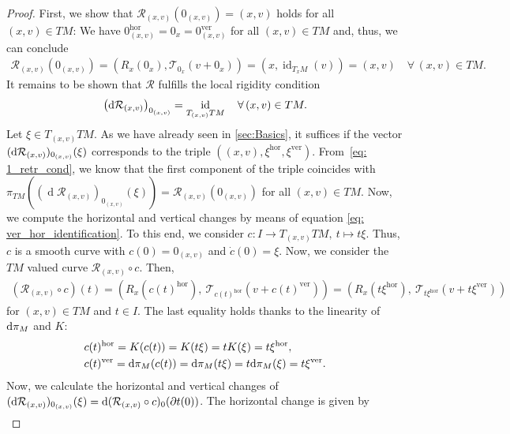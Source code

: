 \documentclass[11pt,a4paper]{article}
\theoremstyle{plain}
\theoremstyle{definition}
\DeclareMathOperator{\id}{id}
\renewcommand{\d}{\operatorname{d}}
\newcommand{\hor}{\operatorname{hor}}
\newcommand{\ver}{\operatorname{ver}}
\begin{document}
\begin{proof}
	First, we show that $\mathcal{R}_{(x, v)}(0_{(x, v)}) = (x, v)$ holds for all $(x, v)\in TM$: We have $0_{(x, v)}^{\hor} = 0_x = 0_{(x, v)}^{\ver}$ for all $(x, v)\in TM$ and, thus, we can conclude 
	\begin{align}
		\label{eq: 1_retr_cond}
		\mathcal{R}_{(x, v)}\left(0_{(x, v)}\right)
		= \left(R_x(0_x), \mathcal{T}_{0_x}(v + 0_x)\right)
		= \left(x, \id_{T_xM}(v)\right)
		= (x, v)\quad \forall \,(x, v)\in TM.
	\end{align}
	It remains  to be shown that $\mathcal{R}$ fulfills the local rigidity condition
	\begin{align*}
		\left(\textup{d}\mathcal{R}_{(x, v)}\right)_{0_{(x, v)}}
		= \id_{T_{(x, v)}TM}\quad \forall \,(x, v)\in TM.
	\end{align*}
	Let $\xi\in T_{(x, v)}TM$. 
	As we have already seen in \cref{sec:Basics}, it suffices if the vector $(\textup{d}\mathcal{R}_{(x, v)})_{0_{(x, v)}}(\xi)$ corresponds to the triple $((x, v), \xi^{\hor}, \xi^{\ver})$. 
	From~\eqref{eq: 1_retr_cond}, we know that the first component of the triple coincides with $\pi_{TM}((\d\mathcal{R}_{(x, v)})_{0_{(x, v)}}(\xi)) = \mathcal{R}_{(x, v)}\left(0_{(x, v)}\right)$ for all $(x, v)\in TM$. Now, we compute the horizontal and vertical changes by means of equation \eqref{eq: ver_hor_identification}. To this end, we consider $c\colon I\to T_{(x, v)}TM,\ t\mapsto t\xi$. Thus, $c$ is a smooth curve with $c(0) = 0_{(x, v)}$ and $\dot{c}(0) = \xi$. Now, we consider the $TM$ valued curve $\mathcal{R}_{(x, v)}\circ c$. Then,
	\begin{align*}
		(\mathcal{R}_{(x, v)}\circ c)(t)
		= \left(R_x(c(t)^{\hor}),\ \mathcal{T}_{c(t)^{\hor}}(v + c(t)^{\ver})\right)
		= \left(R_x(t \xi^{\hor}),\ \mathcal{T}_{t\xi^{\hor}}(v + t \xi^{\ver})\right)
	\end{align*}
	for $(x, v)\in TM$ and $t\in I$. The last equality holds thanks to the linearity of $\textup{d}\pi_M$ and $K$: 
	\begin{align*}
		&c(t)^{\hor} 
		= K(c(t)) 
		= K(t \xi) 
		= t K(\xi) 
		= t \xi^{\hor}, \\
		&c(t)^{\ver}
		= \textup{d}\pi_M(c(t))
		= \textup{d}\pi_M(t \xi)
		= t \textup{d}\pi_M(\xi)
		= t \xi^{\ver}.
	\end{align*}
	Now, we calculate the horizontal and vertical changes of $(\textup{d}\mathcal{R}_{(x, v)})_{0_{(x, v)}}(\xi) = \textup{d}(\mathcal{R}_{(x, v)}\circ c)_0(\partial t(0))$. The horizontal change is given by 
	\begin{align*}

\end{align*}
\end{proof}
\end{document}
